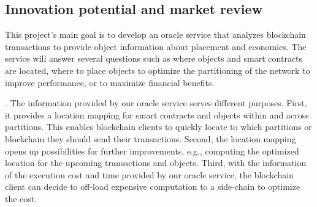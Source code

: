 \subsection{Innovation potential and market review} 

This project's main goal is to develop an oracle service that analyzes
blockchain transactions to provide object information about placement and
economics. The service will answer several questions such as where objects and
smart contracts are located, where to place objects to optimize the partitioning
of the network to improve performance, or to maximize financial benefits.

. The information provided by our oracle service serves
different purposes. First, it provides a location mapping for smart contracts
and objects within and across partitions. This enables blockchain clients to
quickly locate to which partitions or blockchain they should send their
transactions. Second, the location mapping opens up possibilities for further
improvements, e.g., computing the optimized location for the upcoming
transactions and objects. Third, with the information of the execution cost and
time provided by our oracle service, the blockchain client can decide to
off-load expensive computation to a side-chain to optimize the cost. 



